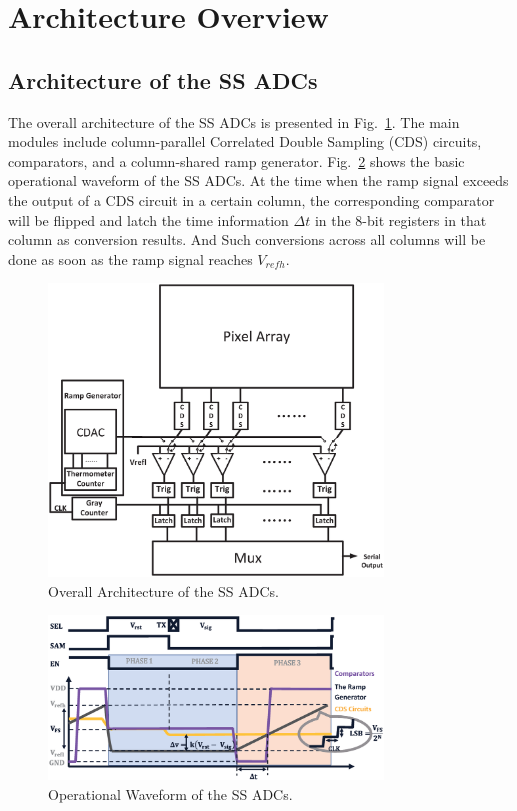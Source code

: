 \section{Architecture Overview}\label{architecture}

\subsection{Architecture of the SS ADCs}

The overall architecture of the SS ADCs is presented in Fig.~\ref{SSADC}. The main modules include column-parallel Correlated Double Sampling (CDS) circuits, comparators, 
and a column-shared ramp generator. Fig.~\ref{SSWAVE} shows the basic operational waveform of the SS ADCs. At the time when the ramp signal exceeds the output of a CDS circuit in a certain column, 
the corresponding comparator will be flipped and latch the time information $\Delta t$ in the 8-bit registers in that column as conversion results. 
And Such conversions across all columns will be done as soon as the ramp signal reaches $V_{refh}$.

\begin{figure}[htbp]
	\centerline{\includegraphics[width=3.5in]{./Figures/SSADC.eps}}
	\caption{Overall Architecture of the SS ADCs.}
	\label{SSADC}
\end{figure} 

\begin{figure}[htbp]
	\centerline{\includegraphics[width=3.5in]{./Figures/SSWAVE.eps}}
	\caption{Operational Waveform of the SS ADCs.}
	\label{SSWAVE}
\end{figure}

